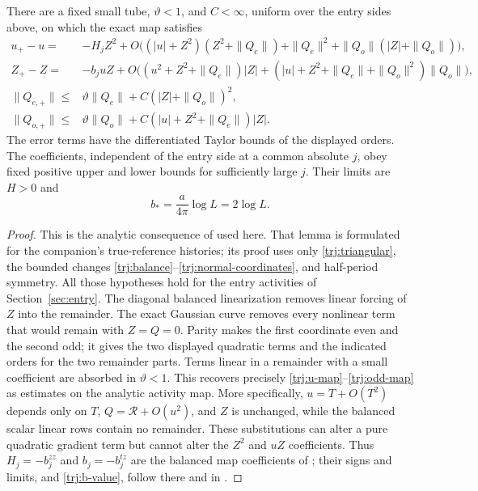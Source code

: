 \begin{lemma}\label{trj:parity-interface}
There are a fixed small tube, \(\vartheta<1\), and \(C<\infty\),
uniform over the entry sides above, on which the exact map satisfies
\begin{align}
 u_+-u={}&-H_jZ^2+
 O\bigl((|u|+Z^2)(Z^2+\|Q_e\|)+\|Q_e\|^2
                    +\|Q_o\|(|Z|+\|Q_o\|)\bigr),
                                      \label{trj:u-map}\\
 Z_+-Z={}&-b_juZ+
 O\bigl((u^2+Z^2+\|Q_e\|)|Z|
       +( |u|+Z^2+\|Q_e\|+\|Q_o\|^2)\|Q_o\|\bigr),
                                      \label{trj:z-map}\\
 \|Q_{e,+}\|\le{}&\vartheta\|Q_e\|
                         +C(|Z|+\|Q_o\|)^2,
                                      \label{trj:even-map}\\
 \|Q_{o,+}\|\le{}&\vartheta\|Q_o\|
                         +C(|u|+Z^2+\|Q_e\|)|Z|.
                                      \label{trj:odd-map}
\end{align}
The error terms have the differentiated Taylor bounds of the
displayed orders.  The coefficients, independent of the entry side
at a common absolute \(j\), obey fixed positive upper and lower
bounds for sufficiently large \(j\).  Their limits are \(H>0\) and
\begin{equation}\label{trj:b-value}
                       b_* =\frac{a}{4\pi}\log L=2\log L.
\end{equation}
\end{lemma}

\begin{proof}
This is the analytic consequence of \cite[Lemma~10.6]{B} used here.
That lemma is formulated for the companion's true-reference histories;
its proof uses only \eqref{trj:triangular}, the bounded changes
\eqref{trj:balance}--\eqref{trj:normal-coordinates}, and half-period
symmetry.  All those hypotheses hold for the entry activities of
Section~\ref{sec:entry}.  The diagonal balanced linearization removes
linear forcing of \(Z\) into the remainder.  The exact Gaussian curve
removes every nonlinear term that would remain with \(Z=Q=0\).
Parity makes the first coordinate even and the second odd; it gives
the two displayed quadratic terms and the indicated orders for the
two remainder parts.  Terms linear in a remainder with a small
coefficient are absorbed in \(\vartheta<1\).  This recovers precisely
\eqref{trj:u-map}--\eqref{trj:odd-map} as estimates on the analytic
activity map.  More specifically, \(u=T+O(T^2)\) depends only on \(T\),
\(Q=\mathcal R+O(u^2)\), and \(Z\) is unchanged, while the balanced
scalar linear rows contain no remainder.  These substitutions can
alter a pure quadratic gradient term but cannot alter the \(Z^2\) and
\(uZ\) coefficients.  Thus
\(H_j=-b_j^{zz}\) and \(b_j=-b_j^{tz}\) are the balanced map coefficients
of \cite[Proposition~8.5]{B}; their signs and limits, and
\eqref{trj:b-value}, follow there and in \cite[Equation~(8.22)]{B}.
\end{proof}


